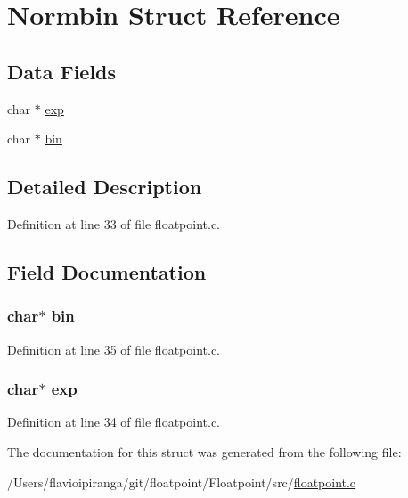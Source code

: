 \hypertarget{struct_normbin}{\section{Normbin Struct Reference}
\label{struct_normbin}
}
\subsection*{Data Fields}
\begin{DoxyCompactItemize}
\item 
char $\ast$ \hyperlink{struct_normbin_afc541abe000a672ebe850f1448b25306}{exp}
\item 
char $\ast$ \hyperlink{struct_normbin_a9390ad84cc9d17b93dbb15acd0207cf5}{bin}
\end{DoxyCompactItemize}


\subsection{Detailed Description}


Definition at line 33 of file floatpoint.\-c.



\subsection{Field Documentation}
\hypertarget{struct_normbin_a9390ad84cc9d17b93dbb15acd0207cf5}{
\subsubsection[{bin}]{\setlength{\rightskip}{0pt plus 5cm}char$\ast$ bin}}\label{struct_normbin_a9390ad84cc9d17b93dbb15acd0207cf5}


Definition at line 35 of file floatpoint.\-c.

\hypertarget{struct_normbin_afc541abe000a672ebe850f1448b25306}{
\subsubsection[{exp}]{\setlength{\rightskip}{0pt plus 5cm}char$\ast$ exp}}\label{struct_normbin_afc541abe000a672ebe850f1448b25306}


Definition at line 34 of file floatpoint.\-c.



The documentation for this struct was generated from the following file\-:\begin{DoxyCompactItemize}
\item 
/\-Users/flavioipiranga/git/floatpoint/\-Floatpoint/src/\hyperlink{floatpoint_8c}{floatpoint.\-c}\end{DoxyCompactItemize}
